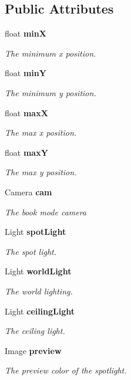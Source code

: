 \subsection*{Public Attributes}
\begin{DoxyCompactItemize}
\item 
float {\bf minX}
\begin{DoxyCompactList}\small\item\em The minimum x position. \end{DoxyCompactList}\item 
float {\bf minY}
\begin{DoxyCompactList}\small\item\em The minimum y position. \end{DoxyCompactList}\item 
float {\bf maxX}
\begin{DoxyCompactList}\small\item\em The max x position. \end{DoxyCompactList}\item 
float {\bf maxY}
\begin{DoxyCompactList}\small\item\em The max y position. \end{DoxyCompactList}\item 
Camera {\bf cam}
\begin{DoxyCompactList}\small\item\em The book mode camera \end{DoxyCompactList}\item 
Light {\bf spot\+Light}
\begin{DoxyCompactList}\small\item\em The spot light. \end{DoxyCompactList}\item 
Light {\bf world\+Light}
\begin{DoxyCompactList}\small\item\em The world lighting. \end{DoxyCompactList}\item 
Light {\bf ceiling\+Light}
\begin{DoxyCompactList}\small\item\em The ceiling light. \end{DoxyCompactList}\item 
Image {\bf preview}
\begin{DoxyCompactList}\small\item\em The preview color of the spotlight. \end{DoxyCompactList}\item 

\end{DoxyCompactItemize}
